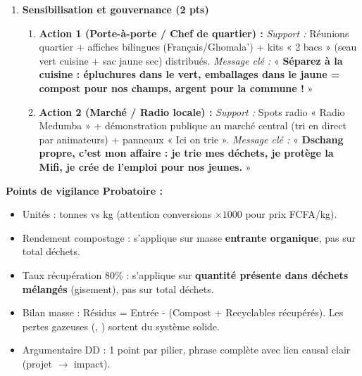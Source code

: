 \documentclass[11pt]{article}
\begin{document}
\begin{corrige}
\begin{enumerate}
    \item \textbf{Sensibilisation et gouvernance (2 pts)}
    \begin{enumerate}
        \item \textbf{Action 1 (Porte-à-porte / Chef de quartier) :} \textit{Support :} Réunions quartier + affiches bilingues (Français/Ghomala') + kits « 2 bacs » (seau vert cuisine + sac jaune sec) distribués. \textit{Message clé :} « \textbf{Séparez à la cuisine : épluchures dans le vert, emballages dans le jaune = compost pour nos champs, argent pour la commune !} »
        \item \textbf{Action 2 (Marché / Radio locale) :} \textit{Support :} Spots radio « Radio Medumba » + démonstration publique au marché central (tri en direct par animateurs) + panneaux « Ici on trie ». \textit{Message clé :} « \textbf{Dschang propre, c'est mon affaire : je trie mes déchets, je protège la Mifi, je crée de l'emploi pour nos jeunes.} »
    \end{enumerate}
\end{enumerate}
\textbf{Points de vigilance Probatoire :} 
\begin{itemize}
    \item Unités : tonnes vs kg (attention conversions $\times 1000$ pour prix FCFA/kg).
    \item Rendement compostage : s'applique sur masse \textbf{entrante organique}, pas sur total déchets.
    \item Taux récupération 80\% : s'applique sur \textbf{quantité présente dans déchets mélangés} (gisement), pas sur total déchets.
    \item Bilan masse : Résidus = Entrée - (Compost + Recyclables récupérés). Les pertes gazeuses (, ) sortent du système solide.
    \item Argumentaire DD : 1 point par pilier, phrase complète avec lien causal clair (projet $\rightarrow$ impact).
\end{itemize}
\end{corrige}
\end{document}
